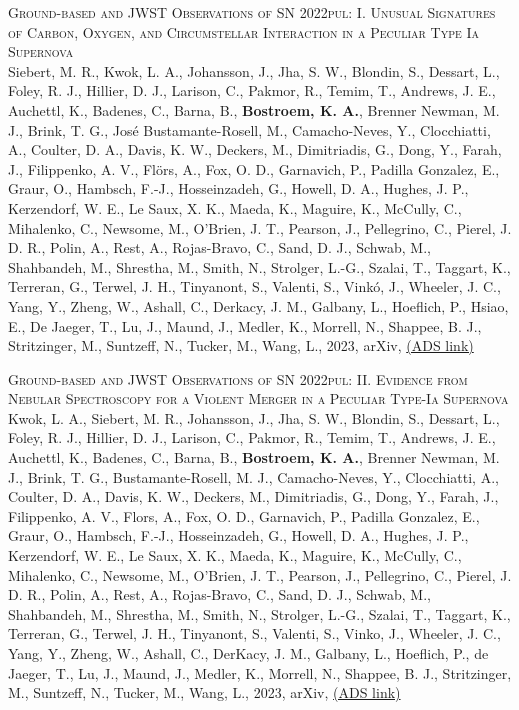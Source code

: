 \begin{revnumerate}[67]
\item{\textsc{Ground-based and JWST Observations of SN 2022pul: I. Unusual Signatures of Carbon, Oxygen, and Circumstellar Interaction in a Peculiar Type Ia Supernova}\\ 
Siebert, M. R., Kwok, L. A., Johansson, J., Jha, S. W., Blondin, S., Dessart, L., Foley, R. J., Hillier, D. J., Larison, C., Pakmor, R., Temim, T., Andrews, J. E., Auchettl, K., Badenes, C., Barna, B., \textbf{Bostroem, K. A.}, Brenner Newman, M. J., Brink, T. G., José Bustamante-Rosell, M., Camacho-Neves, Y., Clocchiatti, A., Coulter, D. A., Davis, K. W., Deckers, M., Dimitriadis, G., Dong, Y., Farah, J., Filippenko, A. V., Flörs, A., Fox, O. D., Garnavich, P., Padilla Gonzalez, E., Graur, O., Hambsch, F.-J., Hosseinzadeh, G., Howell, D. A., Hughes, J. P., Kerzendorf, W. E., Le Saux, X. K., Maeda, K., Maguire, K., McCully, C., Mihalenko, C., Newsome, M., O'Brien, J. T., Pearson, J., Pellegrino, C., Pierel, J. D. R., Polin, A., Rest, A., Rojas-Bravo, C., Sand, D. J., Schwab, M., Shahbandeh, M., Shrestha, M., Smith, N., Strolger, L.-G., Szalai, T., Taggart, K., Terreran, G., Terwel, J. H., Tinyanont, S., Valenti, S., Vinkó, J., Wheeler, J. C., Yang, Y., Zheng, W., Ashall, C., Derkacy, J. M., Galbany, L., Hoeflich, P., Hsiao, E., De Jaeger, T., Lu, J., Maund, J., Medler, K., Morrell, N., Shappee, B. J., Stritzinger, M., Suntzeff, N., Tucker, M., Wang, L., 2023, arXiv, 
\color{blue}\href{https://ui.adsabs.harvard.edu/abs/2023arXiv230812449S}{(ADS link)}\color{black}}\\

\item{\textsc{Ground-based and JWST Observations of SN 2022pul: II. Evidence from Nebular Spectroscopy for a Violent Merger in a Peculiar Type-Ia Supernova}\\ 
Kwok, L. A., Siebert, M. R., Johansson, J., Jha, S. W., Blondin, S., Dessart, L., Foley, R. J., Hillier, D. J., Larison, C., Pakmor, R., Temim, T., Andrews, J. E., Auchettl, K., Badenes, C., Barna, B., \textbf{Bostroem, K. A.}, Brenner Newman, M. J., Brink, T. G., Bustamante-Rosell, M. J., Camacho-Neves, Y., Clocchiatti, A., Coulter, D. A., Davis, K. W., Deckers, M., Dimitriadis, G., Dong, Y., Farah, J., Filippenko, A. V., Flors, A., Fox, O. D., Garnavich, P., Padilla Gonzalez, E., Graur, O., Hambsch, F.-J., Hosseinzadeh, G., Howell, D. A., Hughes, J. P., Kerzendorf, W. E., Le Saux, X. K., Maeda, K., Maguire, K., McCully, C., Mihalenko, C., Newsome, M., O'Brien, J. T., Pearson, J., Pellegrino, C., Pierel, J. D. R., Polin, A., Rest, A., Rojas-Bravo, C., Sand, D. J., Schwab, M., Shahbandeh, M., Shrestha, M., Smith, N., Strolger, L.-G., Szalai, T., Taggart, K., Terreran, G., Terwel, J. H., Tinyanont, S., Valenti, S., Vinko, J., Wheeler, J. C., Yang, Y., Zheng, W., Ashall, C., DerKacy, J. M., Galbany, L., Hoeflich, P., de Jaeger, T., Lu, J., Maund, J., Medler, K., Morrell, N., Shappee, B. J., Stritzinger, M., Suntzeff, N., Tucker, M., Wang, L., 2023, arXiv, 
\color{blue}\href{https://ui.adsabs.harvard.edu/abs/2023arXiv230812450K}{(ADS link)}\color{black}}\\


\end{revnumerate}
